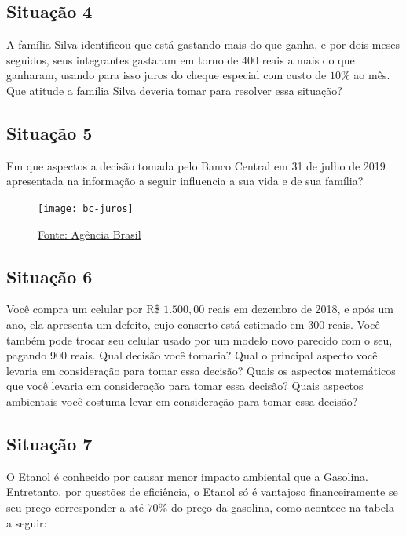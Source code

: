 \subsection{Situação 4}
A família Silva identificou que está gastando mais do que ganha, e por dois meses seguidos, seus integrantes gastaram em torno de 400 reais a mais do que ganharam, usando para isso juros do cheque especial com custo de $10\%$ ao mês. Que atitude a família Silva deveria tomar para resolver essa situação? 


\subsection{Situação 5}
Em que aspectos a decisão tomada pelo Banco Central em 31 de julho de 2019 apresentada na informação a seguir influencia a sua vida e de sua família?

\begin{figure}[H]

\centering
\noindent\texttt{[image: bc-juros]}

\caption{\href{http://agenciabrasil.ebc.com.br/economia/noticia/2019-07/banco-central-surpreende-e-reduz-juros-basicos-para-6-ao-ano. Acesso em 15 de Agosto de 2019.}{Fonte: Agência Brasil}}
\end{figure}

\subsection{Situação 6}
Você compra um celular por R\$ $1.500{,}00$ reais em dezembro de 2018, e após um ano, ela apresenta um defeito, cujo conserto está estimado em 300 reais. Você também pode trocar seu celular usado por um modelo novo parecido com o seu, pagando 900 reais. Qual decisão você tomaria? Qual o principal aspecto você levaria em consideração para tomar essa decisão? Quais os aspectos matemáticos que você levaria em consideração para tomar essa decisão? Quais aspectos ambientais você costuma levar em consideração para tomar essa decisão?

\subsection{Situação 7}
O Etanol é conhecido por causar menor impacto ambiental que a Gasolina. Entretanto, por questões de eficiência, o Etanol só é vantajoso financeiramente se seu preço corresponder a até $70\%$ do preço da gasolina, como acontece na tabela a seguir:


